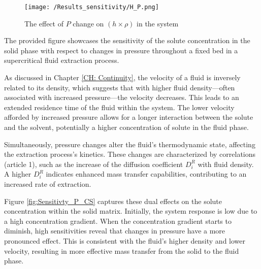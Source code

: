 \documentclass[../Article_Sensitivity_Analsysis.tex]{subfiles}
\begin{document}
    
    \begin{figure}[h!]
    	\centering
    	\texttt{[image: /Results\_sensitivity/H\_P.png]}
    	\caption{The effect of $P$ change on $(h \times \rho)$ in the system}
    	\label{fig:Sensitivty_P_H}
    \end{figure}
    
    The provided figure showcases the sensitivity of the solute concentration in the solid phase with respect to changes in pressure throughout a fixed bed in a supercritical fluid extraction process. 
    
    As discussed in Chapter \ref{CH: Continuity}, the velocity of a fluid is inversely related to its density, which suggests that with higher fluid density—often associated with increased pressure—the velocity decreases. This leads to an extended residence time of the fluid within the system. The lower velocity afforded by increased pressure allows for a longer interaction between the solute and the solvent, potentially a higher concentration of solute in the fluid phase.
    
    Simultaneously, pressure changes alter the fluid's thermodynamic state, affecting the extraction process's kinetics. These changes are characterized by correlations ({\color{red}article 1}), such as the increase of the diffusion coefficient $D_i^R$ with fluid density. A higher $D_i^R$ indicates enhanced mass transfer capabilities, contributing to an increased rate of extraction.
    
    Figure \ref{fig:Sensitivty_P_CS} captures these dual effects on the solute concentration within the solid matrix. Initially, the system response is low due to a high concentration gradient. When the concentration gradient starts to diminish, high sensitivities reveal that changes in pressure have a more pronounced effect. This is consistent with the fluid's higher density and lower velocity, resulting in more effective mass transfer from the solid to the fluid phase.
    
\end{document}
